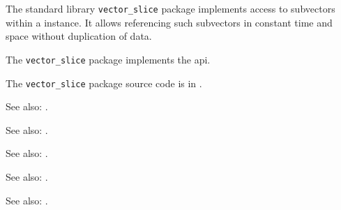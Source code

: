 
The standard library {\tt vector\_slice} package implements access to subvectors within a 
 instance.  It allows referencing such subvectors in 
constant time and space without duplication of data.

The {\tt vector\_slice} package implements the  api.

The {\tt vector\_slice} package source code is in .


See also: .

See also: .

See also: .

See also: .

See also: .




